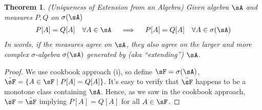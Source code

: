 \documentclass[12pt]{article}
\theoremstyle{plain}
\newtheorem{thm}{Theorem}[section]
\theoremstyle{definition}
\theoremstyle{remark}
\newcommand{\ninf}{_{n=1}^\infty}
\begin{document}
\begin{thm}\emph{(Uniqueness of Extension from an Algebra)}
Given algebra $\sA$ and measures $P,Q$ on $\sigma(\sA)$
\begin{align*}
  P[A]=Q[A]
  \quad \forall A\in\sA
  \quad\implies\quad
  P[A]=Q[A]
  \quad \forall A\in\sigma(\sA)
\end{align*}
In words, if the measures agree on $\sA$, they also agree on the larger
and more complex $\sigma$-algebra $\sigma(\sA)$ generated by
(aka ``extending'') $\sA$.
\end{thm}
\begin{proof}
We use cookbook approach (i), so define $\sF = \sigma(\sA)$,
$\tilde{\sF} = \{A\in \sF\;|\;P[A]=Q[A]\}$.
It's easy to verify that $\tilde{\sF}$ happens to be a monotone class
containing $\sA$.
Hence, as we saw in the cookbook approach,
$\sF=\tilde{\sF}$ implying $P[A]=Q[A]$ for all $A\in\sF$.
\end{proof}
\end{document}
